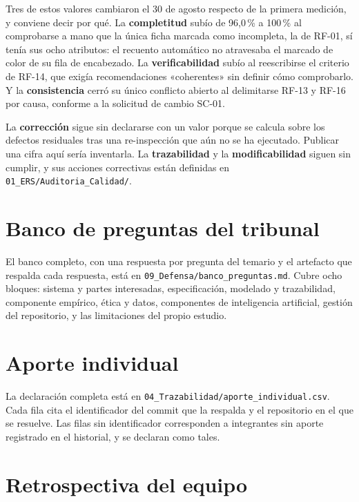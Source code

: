 \documentclass[11pt,a4paper]{article}
\begin{document}
Tres de estos valores cambiaron el 30 de agosto respecto de la primera medici\'on, y
conviene decir por qu\'e. La \textbf{completitud} sub\'io de 96,0\,\% a 100\,\% al comprobarse
a mano que la \'unica ficha marcada como incompleta, la de RF-01, s\'i ten\'ia sus ocho
atributos: el recuento autom\'atico no atravesaba el marcado de color de su fila de
encabezado. La \textbf{verificabilidad} sub\'io al reescribirse el criterio de RF-14,
que exig\'ia recomendaciones «coherentes» sin definir c\'omo comprobarlo. Y la
\textbf{consistencia} cerr\'o su \'unico conflicto abierto al delimitarse RF-13 y RF-16
por causa, conforme a la solicitud de cambio SC-01.

La \textbf{correcci\'on} sigue sin declararse con un valor porque se calcula sobre los
defectos residuales tras una re-inspecci\'on que a\'un no se ha ejecutado. Publicar una
cifra aqu\'i ser\'ia inventarla. La \textbf{trazabilidad} y la \textbf{modificabilidad}
siguen sin cumplir, y sus acciones correctivas est\'an definidas en
\texttt{01\_ERS/Auditoria\_Calidad/}.

\section{Banco de preguntas del tribunal}
\label{anx:banco}

El banco completo, con una respuesta por pregunta del temario y el artefacto que
respalda cada respuesta, est\'a en \texttt{09\_Defensa/banco\_preguntas.md}. Cubre ocho
bloques: sistema y partes interesadas, especificaci\'on, modelado y trazabilidad,
componente emp\'irico, \'etica y datos, componentes de inteligencia artificial,
gesti\'on del repositorio, y las limitaciones del propio estudio.

\section{Aporte individual}
\label{anx:aporte}

La declaraci\'on completa est\'a en
\texttt{04\_Trazabilidad/aporte\_individual.csv}. Cada fila cita el identificador del
commit que la respalda y el repositorio en el que se resuelve. Las filas sin
identificador corresponden a integrantes sin aporte registrado en el historial, y se
declaran como tales.

\section{Retrospectiva del equipo}
\label{anx:retrospectiva}
\end{document}
